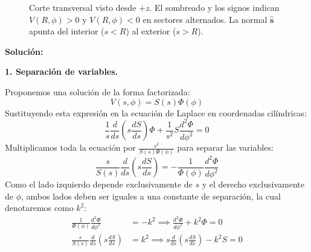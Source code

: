 \documentclass[11pt]{article}
\begin{document}
\begin{figure}[htbp]
\centering
{}
\caption{Corte transversal visto desde $+z$. El sombreado y los signos
indican $V(R,\phi)>0$ y $V(R,\phi)<0$ en sectores alternados. La normal
$\hat{\mathbf s}$ apunta del interior ($s<R$) al exterior ($s>R$).}
\label{fig:geometria}
\end{figure}

\textbf{Solución:}

\textbf{1. Separación de variables.}\par
Proponemos una solución de la forma factorizada:
\begin{equation*}
V(s, \phi) = S(s) \Phi(\phi)
\end{equation*}
Sustituyendo esta expresión en la ecuación de Laplace en coordenadas cilíndricas:
\begin{equation*}
\frac{1}{s} \frac{d}{ds}\left(s \frac{dS}{ds}\right) \Phi + \frac{1}{s^2} S \frac{d^2\Phi}{d\phi^2} = 0
\end{equation*}
Multiplicamos toda la ecuación por $\frac{s^2}{S(s)\Phi(\phi)}$ para separar las variables:
\begin{equation*}
\frac{s}{S(s)} \frac{d}{ds}\left(s \frac{dS}{ds}\right) = - \frac{1}{\Phi(\phi)} \frac{d^2\Phi}{d\phi^2}
\end{equation*}
Como el lado izquierdo depende exclusivamente de $s$ y el derecho exclusivamente de $\phi$, ambos lados deben ser iguales a una constante de separación, la cual denotaremos como $k^2$:
\begin{align*}
\frac{1}{\Phi(\phi)} \frac{d^2\Phi}{d\phi^2} &= -k^2 \implies \frac{d^2\Phi}{d\phi^2} + k^2 \Phi = 0 \\
\frac{s}{S(s)} \frac{d}{ds}\left(s \frac{dS}{ds}\right) &= k^2 \implies s \frac{d}{ds}\left(s \frac{dS}{ds}\right) - k^2 S = 0
\end{align*}
\end{document}
